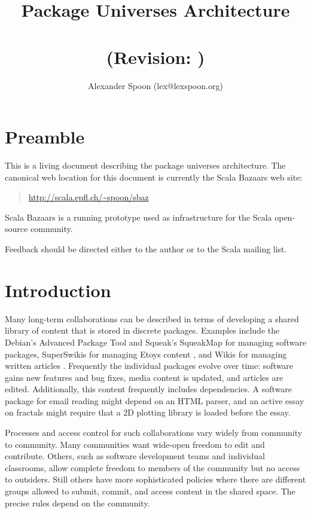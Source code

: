 \documentclass{article}
\begin{document}

\title{Package Universes Architecture\\
       {\svndate} \\
       (Revision: \svnversion)}
\author{Alexander Spoon (lex@lexspoon.org)}
\date{}
\maketitle

\section{Preamble}
This is a living document describing the package universes
architecture.  
The canonical web location for this document is currently the Scala
Bazaars web site:
\begin{quote}
  \url{http://scala.epfl.ch/~spoon/sbaz}
\end{quote}
Scala Bazaars is a running prototype used as infrastructure for the
Scala \cite{scala:spec, scala:web} open-source community.

Feedback should be directed either to the author or to the Scala
mailing list.


\section{Introduction}
Many long-term collaborations can be described in terms of developing
a shared library of content that is stored in discrete packages.  
Examples include the Debian's Advanced Package Tool \cite{apt:howto} and
Squeak's SqueakMap for managing software packages, SuperSwikis for
managing Etoys content \cite{steinmetz02:learning}, and Wikis for
managing written articles \cite{ward01:wikiway}.  Frequently the
individual packages evolve over time: software gains new features and
bug fixes, media content is updated, and articles are edited.
Additionally, this content frequently includes dependencies.  A
software package for email reading might depend on an HTML
parser, and an active essay on fractals might require that
a 2D plotting library is loaded before the essay.

Processes and access control for such collaborations vary widely from
community to community.  Many communities want wide-open freedom to edit
and contribute.  Others, such as software development teams and
individual classrooms, allow complete freedom to members of the
community but no access to outsiders.  Still others have more
sophisticated policies where there are different groups allowed to
submit, commit, and access content in the shared space.  The precise
rules depend on the community.
\end{document}
